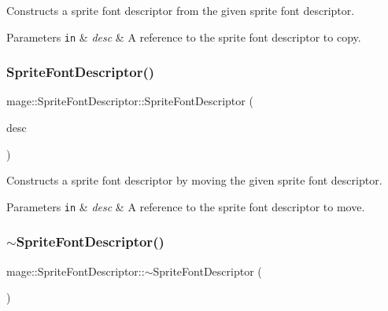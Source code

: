 Constructs a sprite font descriptor from the given sprite font descriptor.


\begin{DoxyParams}[1]{Parameters}
\mbox{\tt in}  & {\em desc} & A reference to the sprite font descriptor to copy. \\
\hline
\end{DoxyParams}
\hypertarget{structmage_1_1_sprite_font_descriptor_a1b9b54d75205df352a65e6eb3665d675}{}\label{structmage_1_1_sprite_font_descriptor_a1b9b54d75205df352a65e6eb3665d675} 
\subsubsection{\texorpdfstring{Sprite\+Font\+Descriptor()}{SpriteFontDescriptor()}\hspace{0.1cm}{\footnotesize\ttfamily [3/3]}}
{\footnotesize\ttfamily mage\+::\+Sprite\+Font\+Descriptor\+::\+Sprite\+Font\+Descriptor (\begin{DoxyParamCaption}\item[{\hyperlink{structmage_1_1_sprite_font_descriptor}{Sprite\+Font\+Descriptor} \&\&}]{desc }\end{DoxyParamCaption})\hspace{0.3cm}{\ttfamily [default]}}

Constructs a sprite font descriptor by moving the given sprite font descriptor.


\begin{DoxyParams}[1]{Parameters}
\mbox{\tt in}  & {\em desc} & A reference to the sprite font descriptor to move. \\
\hline
\end{DoxyParams}
\hypertarget{structmage_1_1_sprite_font_descriptor_ab259871eed5ca9be3830d7da9cfc7092}{}\label{structmage_1_1_sprite_font_descriptor_ab259871eed5ca9be3830d7da9cfc7092} 
\subsubsection{\texorpdfstring{$\sim$\+Sprite\+Font\+Descriptor()}{~SpriteFontDescriptor()}}
{\footnotesize\ttfamily mage\+::\+Sprite\+Font\+Descriptor\+::$\sim$\+Sprite\+Font\+Descriptor (\begin{DoxyParamCaption}{ }\end{DoxyParamCaption})\hspace{0.3cm}{\ttfamily [default]}}


